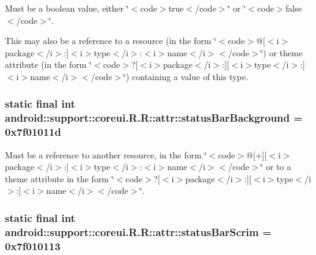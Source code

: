 Must be a boolean value, either \char`\"{}$<$code$>$true$<$/code$>$\char`\"{} or \char`\"{}$<$code$>$false$<$/code$>$\char`\"{}. 

This may also be a reference to a resource (in the form \char`\"{}$<$code$>$@\mbox{[}$<$i$>$package$<$/i$>$:\mbox{]}$<$i$>$type$<$/i$>$:$<$i$>$name$<$/i$>$$<$/code$>$\char`\"{}) or theme attribute (in the form \char`\"{}$<$code$>$?\mbox{[}$<$i$>$package$<$/i$>$:\mbox{]}\mbox{[}$<$i$>$type$<$/i$>$:\mbox{]}$<$i$>$name$<$/i$>$$<$/code$>$\char`\"{}) containing a value of this type. \hypertarget{classandroid_1_1support_1_1coreui_1_1_r_1_1attr_b8924bfe01d9916109859ca701367ad1}{
\subsubsection[{statusBarBackground}]{\setlength{\rightskip}{0pt plus 5cm}static final int android::support::coreui.R.R::attr::statusBarBackground = 0x7f01011d}}
\label{classandroid_1_1support_1_1coreui_1_1_r_1_1attr_b8924bfe01d9916109859ca701367ad1}


Must be a reference to another resource, in the form \char`\"{}$<$code$>$@\mbox{[}+\mbox{]}\mbox{[}$<$i$>$package$<$/i$>$:\mbox{]}$<$i$>$type$<$/i$>$:$<$i$>$name$<$/i$>$$<$/code$>$\char`\"{} or to a theme attribute in the form \char`\"{}$<$code$>$?\mbox{[}$<$i$>$package$<$/i$>$:\mbox{]}\mbox{[}$<$i$>$type$<$/i$>$:\mbox{]}$<$i$>$name$<$/i$>$$<$/code$>$\char`\"{}. \hypertarget{classandroid_1_1support_1_1coreui_1_1_r_1_1attr_12ba1e68bd055f9dced755f878f98946}{
\subsubsection[{statusBarScrim}]{\setlength{\rightskip}{0pt plus 5cm}static final int android::support::coreui.R.R::attr::statusBarScrim = 0x7f010113}}
\label{classandroid_1_1support_1_1coreui_1_1_r_1_1attr_12ba1e68bd055f9dced755f878f98946}


